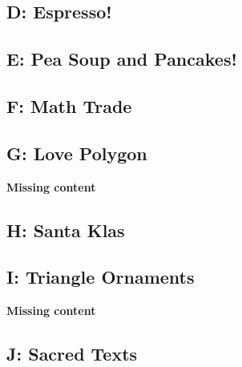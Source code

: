 \documentclass{article}
\begin{document}
\subsection{D: Espresso!}



\subsection{E: Pea Soup and Pancakes!}



\subsection{F: Math Trade}



\subsection{G: Love Polygon}

\textbf{Missing content}

% 

\subsection{H: Santa Klas}



\subsection{I: Triangle Ornaments}

\textbf{Missing content}

% 

\subsection{J: Sacred Texts}


\end{document}
